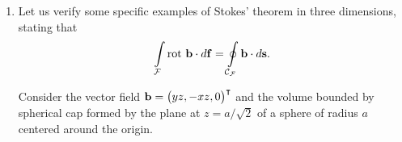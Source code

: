 {\begin{enumerate}
\begin{eqnarray*}
\begin{array}{rcl}
        \int \sin^3 \varphi \, d\varphi & = & -\cos \varphi+
          \frac{1}{3} \cos^3 \varphi
      \end{array}
    \Biggr]  \\
    & = & 3 \cdot 16
    \left\{
      \frac{2 \pi}{2}-
      \underbrace
        {\left[
          \left(1+\frac{1}{3}\right)-\left(1+\frac{1}{3}\right)
        \right]}
      _{=0}
    \right\}=48 \pi
\end{eqnarray*}
For the flux through the surfaces one thus obtains
$$ \oint \limits_F {\bf w} \cdot d{\bf f}=F_1+F_2+F_3=84 \pi .$$





\item
Let us verify  some specific examples of Stokes' theorem in three dimensions,
stating that
\begin{equation}
\int \limits_{\cal F} \textrm{rot } {\bf b} \cdot d{\bf f}   =\oint \limits_{{\cal C}_{\cal F}} {\bf b} \cdot d{\bf s}
.   \label{2011-m-stokes}
\end{equation}

Consider the vector field ${\bf b} = \begin{pmatrix} yz , -xz , 0 \end{pmatrix}^\intercal $
and the volume bounded by spherical cap
formed by the plane at $z = a / \sqrt{2}$ of a sphere of radius $a$ centered around the origin.


\end{enumerate}}
